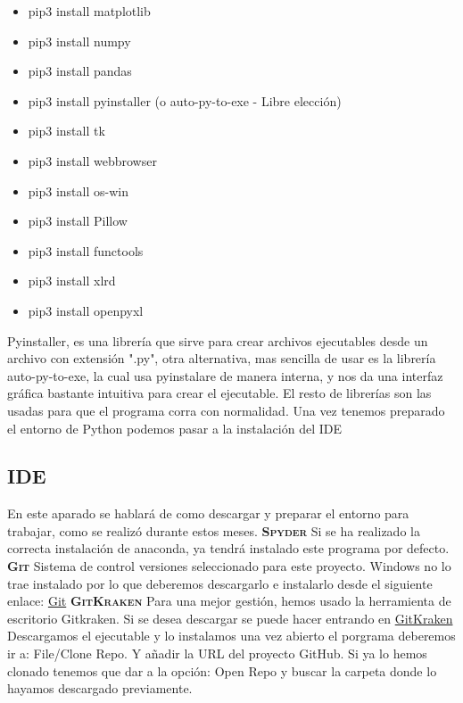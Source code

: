 \begin{itemize}
\item pip3 install matplotlib
\item pip3 install numpy
\item pip3 install pandas
\item pip3 install pyinstaller (o auto-py-to-exe - Libre elección)
\item pip3 install tk
\item pip3 install webbrowser
\item pip3 install os-win
\item pip3 install Pillow
\item pip3 install functools
\item pip3 install xlrd
\item pip3 install openpyxl

\end{itemize}
Pyinstaller, es una librería que sirve para crear archivos ejecutables desde un archivo con extensión ".py", otra alternativa, mas sencilla de usar es la librería auto-py-to-exe, la cual usa pyinstalare de manera interna, y nos da una interfaz gráfica bastante intuitiva para crear el ejecutable. El resto de librerías son las usadas para que el programa corra con normalidad.
Una vez tenemos preparado el entorno de Python podemos pasar a la instalación del IDE
\subsection{IDE}
En este aparado se hablará de como descargar y preparar el entorno para trabajar, como se realizó durante estos meses.
\textbf{\textsc{Spyder}}
Si se ha realizado la correcta instalación de anaconda, ya tendrá instalado este programa por defecto.
\textbf{\textsc{Git}}
Sistema de control versiones seleccionado para este proyecto. Windows no lo trae instalado por lo que deberemos descargarlo e instalarlo desde el siguiente enlace: \href{https://git-scm.com/}{Git}
\textbf{\textsc{GitKraken}}
Para una mejor gestión, hemos usado la herramienta de escritorio Gitkraken. Si se desea descargar se puede hacer entrando en \href{https://gitkraken.com/}{GitKraken}
Descargamos el ejecutable y lo instalamos una vez abierto el porgrama deberemos ir a: File/Clone Repo. Y añadir la URL del proyecto GitHub. Si ya lo hemos clonado tenemos que dar a la opción: Open Repo y buscar la carpeta donde lo hayamos descargado previamente.
